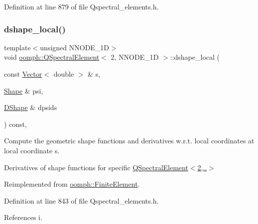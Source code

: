 Definition at line 879 of file Qspectral\+\_\+elements.\+h.

\mbox{\label{classoomph_1_1QSpectralElement_3_012_00_01NNODE__1D_01_4_ab18c64cc7d48d9838c90158f75117638}} 
\subsubsection{\texorpdfstring{dshape\+\_\+local()}{dshape\_local()}}
{\footnotesize\ttfamily template$<$unsigned N\+N\+O\+D\+E\+\_\+1D$>$ \\
void \hyperlink{classoomph_1_1QSpectralElement}{oomph\+::\+Q\+Spectral\+Element}$<$ 2, N\+N\+O\+D\+E\+\_\+1D $>$\+::dshape\+\_\+local (\begin{DoxyParamCaption}\item[{const \hyperlink{classoomph_1_1Vector}{Vector}$<$ double $>$ \&}]{s,  }\item[{\hyperlink{classoomph_1_1Shape}{Shape} \&}]{psi,  }\item[{\hyperlink{classoomph_1_1DShape}{D\+Shape} \&}]{dpsids }\end{DoxyParamCaption}) const\hspace{0.3cm}{\ttfamily [inline]}, {\ttfamily [virtual]}}



Compute the geometric shape functions and derivatives w.\+r.\+t. local coordinates at local coordinate s. 

Derivatives of shape functions for specific \hyperlink{classoomph_1_1QSpectralElement_3_012_00_01NNODE__1D_01_4_a950e01a426602b45c67c19fdf0693583}{Q\+Spectral\+Element$<$2,..$>$} 

Reimplemented from \hyperlink{classoomph_1_1FiniteElement_a9db1456b827131c21a991ac9fedf4b0c}{oomph\+::\+Finite\+Element}.



Definition at line 843 of file Qspectral\+\_\+elements.\+h.



References i.

\mbox{\label{classoomph_1_1QSpectralElement_3_012_00_01NNODE__1D_01_4_a9495694ed222c8e9e41eee93734581d7}} 
